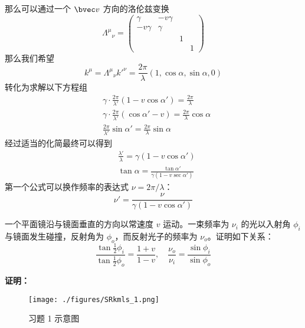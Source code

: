 那么可以通过一个 $\bvec v$ 方向的洛伦兹变换
\begin{equation}
\Lambda^\mu{}_\nu=\begin{pmatrix}
\gamma & -v\gamma &  & \\
-v\gamma & \gamma &  & \\
& & 1 & \\
& & & 1
\end{pmatrix}
\end{equation}
那么我们希望
\begin{equation}
k^\mu = \Lambda^\mu{}_\nu k'^\nu = \frac{2\pi}{\lambda}(1,\cos\alpha,\sin\alpha,0)
\end{equation}
转化为求解以下方程组
\begin{equation}
\begin{aligned}
& \gamma\cdot\frac{2\pi}{\lambda'}\left(1-v\cos\alpha'\right)=\frac{2\pi}{\lambda}\\
& \gamma\cdot\frac{2\pi}{\lambda'}\left(\cos\alpha'-v\right)=\frac{2\pi}{\lambda}\cos\alpha\\
& \frac{2\pi}{\lambda'}\sin\alpha' = \frac{2\pi }{\lambda}\sin\alpha
\end{aligned}
\end{equation}
经过适当的化简最终可以得到
\begin{equation}
\begin{aligned}
&\frac{\lambda'}{\lambda}=\gamma(1-v\cos\alpha')\\
&\tan\alpha=\frac{\tan\alpha'}{\gamma(1-v\sec \alpha')}
\end{aligned}
\end{equation}
第一个公式可以换作频率的表达式 $\nu=2\pi/\lambda$：
\begin{equation}
\nu'=\frac{\nu}{\gamma(1-v\cos\alpha')}
\end{equation}

\begin{exercise}{}
一个平面镜沿与镜面垂直的方向以常速度 $v$ 运动。一束频率为 $\nu_i$ 的光以入射角 $\phi_i$ 与镜面发生碰撞，反射角为 $\phi_o$，而反射光子的频率为 $\nu_o$。证明如下关系：
\begin{equation}
	\frac{\tan\frac{1}{2}\phi_i}{\tan\frac{1}{2}\phi_o}=\frac{1+v}{1-v},\quad \frac{\nu_o}{\nu_i}=\frac{\sin\phi_i}{\sin\phi_o}
\end{equation}
\end{exercise}
\textbf{证明：}
\begin{figure}[ht]
\centering
\texttt{[image: ./figures/SRkmls\_1.png]}
\caption{习题 1 示意图} \label{SRkmls_fig1}
\end{figure}

